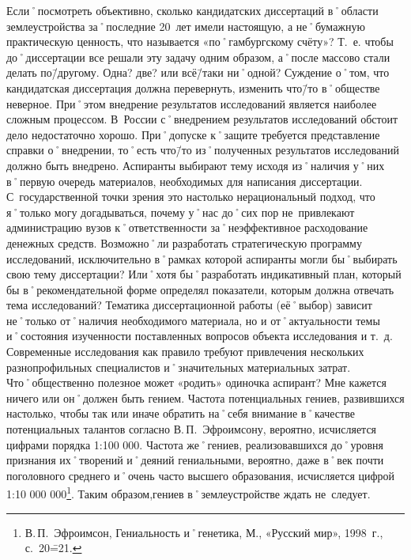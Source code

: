 \begin{drama}
	\maxspeaks Если˚посмотреть объективно, сколько кандидатских диссертаций в˚области землеустройства за˚последние 20~лет имели настоящую, а не˚бумажную практическую ценность, что называется  «по˚гамбургскому счёту»? Т.~е. чтобы до˚диссертации все решали эту задачу одним образом, а˚после массово стали делать по\=/другому. Одна? две? или всё\=/таки ни˚одной? 
	\michaelspeaks Суждение о˚том, что кандидатская диссертация должна перевернуть, изменить что\=/то в˚обществе неверное. При˚этом внедрение результатов исследований является наиболее сложным процессом. В~России с˚внедрением результатов исследований обстоит дело недостаточно хорошо. При˚допуске к˚защите требуется представление справки о˚внедрении, то˚есть что\=/то из˚полученных результатов исследований должно быть внедрено.
	\maxspeaks Аспиранты выбирают тему исходя из˚наличия у˚них в˚первую очередь материалов, необходимых для написания диссертации. С~государственной точки зрения это настолько нерациональный подход, что я˚только могу догадываться, почему у˚нас до˚сих пор не~привлекают администрацию вузов к˚ответственности за˚неэффективное расходование денежных средств. Возможно˚ли разработать стратегическую программу исследований, исключительно в˚рамках которой аспиранты могли бы˚выбирать свою тему диссертации? Или˚хотя бы˚разработать индикативный план, который бы в˚рекомендательной форме определял показатели, которым должна отвечать тема исследований?
	\michaelspeaks Тематика диссертационной работы (её˚выбор) зависит не˚только от˚наличия необходимого материала, но и от˚актуальности темы и˚состояния изученности поставленных вопросов объекта исследования и т.~д.
	\maxspeaks Современные исследования как правило требуют привлечения нескольких разнопрофильных специалистов и˚значительных материальных затрат. Что˚общественно полезное может  «родить» одиночка аспирант? Мне кажется ничего или он˚должен быть гением. Частота потенциальных гениев, развившихся настолько, чтобы так или иначе обратить на˚себя внимание в˚качестве потенциальных талантов согласно В.\,П.~Эфроимсону, вероятно, исчисляется цифрами порядка 1:100 000. Частота же˚гениев, реализовавшихся до˚уровня признания их˚творений и˚деяний гениальными, вероятно, даже в˚век почти поголовного среднего и˚очень часто высшего образования, исчисляется цифрой 1:10 000 000\footnote{В.\,П.~Эфроимсон, Гениальность и˚генетика, М., «Русский мир», 1998~г., с.~20\==21.}. Таким образом,гениев в˚землеустройстве ждать не~следует. 

\end{drama}
